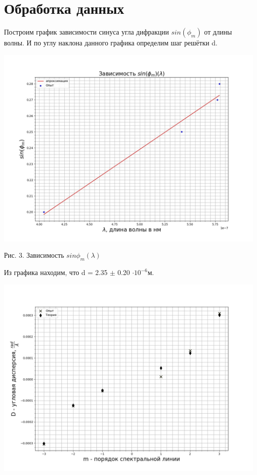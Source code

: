 \documentclass[a4paper,12pt]{article} %
\begin{document}
\section{Обработка данных}
Построим график зависимости синуса угла дифракции $sin(\phi_m)$ от длины волны. И по углу наклона данного графика определим шаг решётки d.
\begin{center}
    \includegraphics[scale=0.45]{9.jpg}
\end{center}
\begin{center}
Рис. 3. Зависимость $sin\phi_m(\lambda)$
\end{center}
Из графика находим, что d = 2.35 $\pm$ 0.20 $\cdot 10^{-6}\text{м}$.
\begin{center}
    \includegraphics[scale=0.3]{10.jpg}
\end{center}
\end{document}
